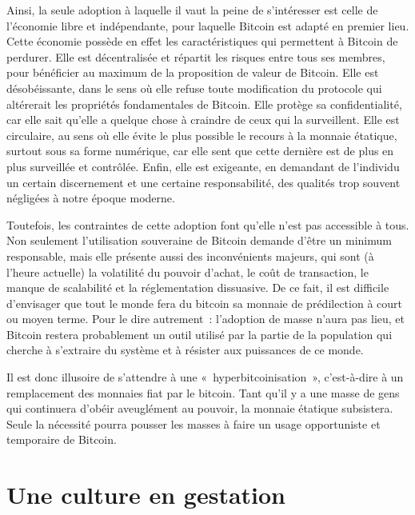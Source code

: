 Ainsi, la seule adoption à laquelle il vaut la peine de s'intéresser est celle de l'économie libre et indépendante, pour laquelle Bitcoin est adapté en premier lieu. Cette économie possède en effet les caractéristiques qui permettent à Bitcoin de perdurer. Elle est décentralisée et répartit les risques entre tous ses membres, pour bénéficier au maximum de la proposition de valeur de Bitcoin. Elle est désobéissante, dans le sens où elle refuse toute modification du protocole qui altérerait les propriétés fondamentales de Bitcoin. Elle protège sa confidentialité, car elle sait qu'elle a quelque chose à craindre de ceux qui la surveillent. Elle est circulaire, au sens où elle évite le plus possible le recours à la monnaie étatique, surtout sous sa forme numérique, car elle sent que cette dernière est de plus en plus surveillée et contrôlée. Enfin, elle est exigeante, en demandant de l'individu un certain discernement et une certaine responsabilité, des qualités trop souvent négligées à notre époque moderne.

Toutefois, les contraintes de cette adoption font qu'elle n'est pas accessible à tous. Non seulement l'utilisation souveraine de Bitcoin demande d'être un minimum responsable, mais elle présente aussi des inconvénients majeurs, qui sont (à l'heure actuelle) la volatilité du pouvoir d'achat, le coût de transaction, le manque de scalabilité et la réglementation dissuasive. De ce fait, il est difficile d'envisager que tout le monde fera du bitcoin sa monnaie de prédilection à court ou moyen terme. Pour le dire autrement~: l'adoption de masse n'aura pas lieu, et Bitcoin restera probablement un outil utilisé par la partie de la population qui cherche à s'extraire du système et à résister aux puissances de ce monde.

Il est donc illusoire de s'attendre à une «~hyperbitcoinisation~», c'est-à-dire à un remplacement des monnaies fiat par le bitcoin. Tant qu'il y a une masse de gens qui continuera d'obéir aveuglément au pouvoir, la monnaie étatique subsistera. Seule la nécessité pourra pousser les masses à faire un usage opportuniste et temporaire de Bitcoin.

\section*{Une culture en gestation}

